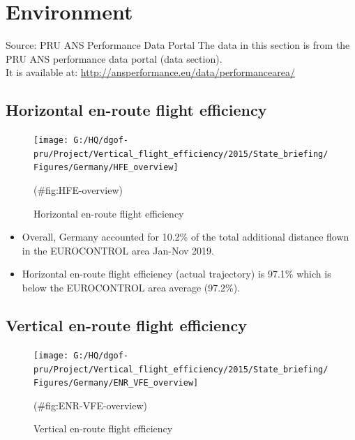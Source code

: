 \documentclass[
]{article}
\providecommand{\tightlist}{%
  \setlength{\itemsep}{0pt}\setlength{\parskip}{0pt}}
\begin{document}
\newpage

\hypertarget{environment}{%
\section{Environment}\label{environment}}

Source: PRU ANS Performance Data Portal
The data in this section is from the PRU ANS performance data portal (data section).\\
It is available at: \url{http://ansperformance.eu/data/performancearea/}

\hypertarget{horizontal-en-route-flight-efficiency}{%
\subsection{Horizontal en-route flight efficiency}\label{horizontal-en-route-flight-efficiency}}

\begin{figure}

{\centering \texttt{[image: G:/HQ/dgof-pru/Project/Vertical\_flight\_efficiency/2015/State\_briefing/Figures/Germany/HFE\_overview]} 

}

\caption{Horizontal en-route flight efficiency}(\#fig:HFE-overview)
\end{figure}

\begin{itemize}
\tightlist
\item
  Overall, Germany accounted for 10.2\% of the total additional distance flown in the EUROCONTROL area Jan-Nov 2019.
\item
  Horizontal en-route flight efficiency (actual trajectory) is 97.1\% which is below the EUROCONTROL area average (97.2\%).
\end{itemize}

\hypertarget{vertical-en-route-flight-efficiency}{%
\subsection{Vertical en-route flight efficiency}\label{vertical-en-route-flight-efficiency}}

\begin{figure}

{\centering \texttt{[image: G:/HQ/dgof-pru/Project/Vertical\_flight\_efficiency/2015/State\_briefing/Figures/Germany/ENR\_VFE\_overview]} 

}

\caption{Vertical en-route flight efficiency}(\#fig:ENR-VFE-overview)
\end{figure}
\end{document}
